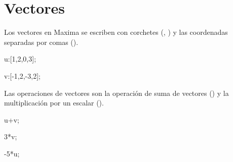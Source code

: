 
\section{Vectores}

Los vectores en Maxima se escriben con corchetes
(\maximain{[}, \maximain{]}) y las coordenadas
separadas por comas (\maximain{,}).
\begin{maximai}
 u:[1,2,0,3];
\end{maximai}\begin{maximao}
 \left[ 1 , 2 , 0 , 3 \right]
\end{maximao}\begin{maximai}
 v:[-1,2,-3,2];
\end{maximai}\begin{maximao}
 \left[ -1 , 2 , -3 , 2 \right]
\end{maximao}

Las operaciones de vectores son la operación de suma
de vectores (\maximain{+}) y la multiplicación por
un escalar (\maximain{*}).
\begin{maximai}
 u+v;
\end{maximai}\begin{maximao}
 \left[ 0 , 4 , -3 , 5 \right]
\end{maximao}\begin{maximai}
 3*v;
\end{maximai}\begin{maximao}
 \left[ -3 , 6 , -9 , 6 \right]
\end{maximao}\begin{maximai}
 -5*u;
\end{maximai}\begin{maximao}
 \left[ -5 , -10 , 0 , -15 \right]
\end{maximao}
